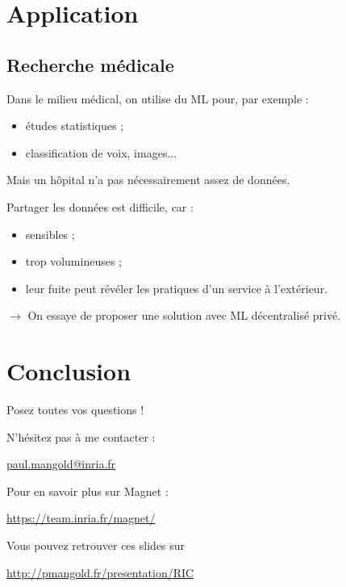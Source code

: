 \documentclass[notheorems]{beamer}
\begin{document}
\section{Application}
\subsection{Recherche médicale}
\begin{frame}
  Dans le milieu médical, on utilise du ML pour, par exemple :
  \begin{itemize}
  \item études statistiques ;
  \item classification de voix, images...
  \end{itemize}

  \vspace{1em}

  Mais un hôpital n'a pas nécessairement assez de données.
\end{frame}

\begin{frame}
  Partager les données est difficile, car :
  \begin{itemize}
  \item sensibles ;
  \item trop volumineuses ;
  \item leur fuite peut révéler les pratiques d'un service à l'extérieur.
  \end{itemize}

  \vspace{1em}

  $\longrightarrow$ On essaye de proposer une solution avec ML décentralisé privé.
\end{frame}

\section{Conclusion}
\begin{frame}
  Posez toutes vos questions !

  \vspace{1em}

  N'hésitez pas à me contacter :

  \quad \url{paul.mangold@inria.fr}

  \vspace{1em}

  Pour en savoir plus sur Magnet :

  \quad \url{https://team.inria.fr/magnet/}

  \vspace{1em}

  Vous pouvez retrouver ces slides sur

  \quad \url{http://pmangold.fr/presentation/RIC}
\end{frame}
\end{document}
